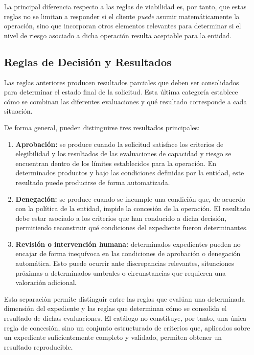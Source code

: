 \documentclass[12pt,a4paper]{report}
\begin{document}
La principal diferencia respecto a las reglas de viabilidad es, por tanto, que estas reglas no se limitan a responder si el cliente \textit{puede} asumir matemáticamente la operación, sino que incorporan otros elementos relevantes para determinar si el nivel de riesgo asociado a dicha operación resulta aceptable para la entidad.

\subsection{Reglas de Decisión y Resultados}

Las reglas anteriores producen resultados parciales que deben ser consolidados para determinar el estado final de la solicitud. Esta última categoría establece cómo se combinan las diferentes evaluaciones y qué resultado corresponde a cada situación.

De forma general, pueden distinguirse tres resultados principales:

\begin{enumerate}
\item \textbf{Aprobación:} se produce cuando la solicitud satisface los criterios de elegibilidad y los resultados de las evaluaciones de capacidad y riesgo se encuentran dentro de los límites establecidos para la operación. En determinados productos y bajo las condiciones definidas por la entidad, este resultado puede producirse de forma automatizada.

\item \textbf{Denegación:} se produce cuando se incumple una condición que, de acuerdo con la política de la entidad, impide la concesión de la operación. El resultado debe estar asociado a los criterios que han conducido a dicha decisión, permitiendo reconstruir qué condiciones del expediente fueron determinantes.

\item \textbf{Revisión o intervención humana:} determinados expedientes pueden no encajar de forma inequívoca en las condiciones de aprobación o denegación automática. Esto puede ocurrir ante discrepancias relevantes, situaciones próximas a determinados umbrales o circunstancias que requieren una valoración adicional.
\end{enumerate}

Esta separación permite distinguir entre las reglas que evalúan una determinada dimensión del expediente y las reglas que determinan cómo se consolida el resultado de dichas evaluaciones. El catálogo no constituye, por tanto, una única regla de concesión, sino un conjunto estructurado de criterios que, aplicados sobre un expediente suficientemente completo y validado, permiten obtener un resultado reproducible.
\end{document}
